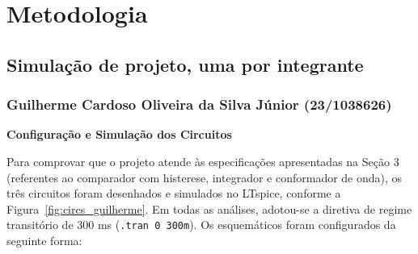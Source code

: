 \documentclass[11pt,a4paper]{article}
\begin{document}



\section{Metodologia}



\subsection{Simulação de projeto, uma por integrante}

\subsubsection{Guilherme Cardoso Oliveira da Silva Júnior (23/1038626)}

\textbf{Configuração e Simulação dos Circuitos}

Para comprovar que o projeto atende às especificações apresentadas na Seção 3 (referentes ao comparador com histerese, integrador e conformador de onda), os três circuitos foram desenhados e simulados no LTspice, conforme a Figura~\ref{fig:circs_guilherme}. Em todas as análises, adotou-se a diretiva de regime transitório de 300 ms (\texttt{.tran 0 300m}). Os esquemáticos foram configurados da seguinte forma:
\end{document}
